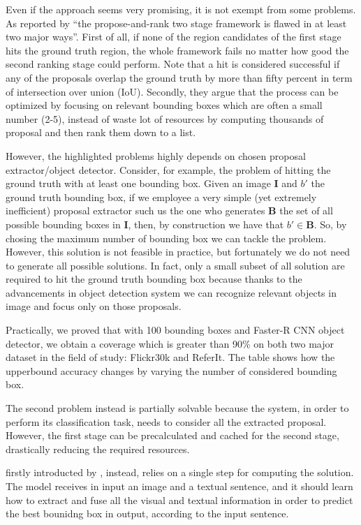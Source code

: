 Even if the approach seems very promising, it is not exempt from some
problems. As reported by  ``the
propose-and-rank two stage framework is flawed in at least two major
ways''. First of all, if none of the region candidates of the first
stage hits the ground truth region, the whole framework fails no
matter how good the second ranking stage could perform. Note that a
hit is considered successful if any of the proposals overlap the
ground truth by more than fifty percent in term of intersection over
union (IoU). Secondly, they argue that the process can be optimized by
focusing on relevant bounding boxes which are often a small number
(2-5), instead of waste lot of resources by computing thousands of
proposal and then rank them down to a list.

However, the highlighted problems highly depends on chosen
proposal extractor/object detector. Consider, for example, the problem
of hitting the ground truth with at least one bounding box. Given an
image $\bm{I}$ and $b'$ the ground truth bounding box, if we employee
a very simple (yet extremely inefficient) proposal extractor such us
the one who generates $\bm{B}$ the set of all possible bounding boxes
in $\bm{I}$, then, by construction we have that $b' \in \bm{B}$. So,
by chosing the maximum number of bounding box we can tackle the
problem. However, this solution is not feasible in practice, but
fortunately we do not need to generate all possible solutions. In
fact, only a small subset of all solution are required to hit the
ground truth bounding box because thanks to the advancements in object
detection system we can recognize relevant objects in image and focus
only on those proposals.

Practically, we proved that with 100 bounding boxes and Faster-R CNN
object detector, we obtain a coverage which is greater than 90\% on
both two major dataset in the field of study: Flickr30k and ReferIt.
The table  shows how the upperbound accuracy changes
by varying the number of considered bounding box.

The second problem instead is partially solvable because the system,
in order to perform its classification task, needs to consider all the
extracted proposal. However, the first stage can be precalculated and
cached for the second stage, drastically reducing the required
resources. 

 firstly introducted by , instead, relies on a single step for
computing the solution. The model receives in input an image and a
textual sentence, and it should learn how to extract and fuse all the
visual and textual information in order to predict the best bounidng
box in output, according to the input sentence. 

